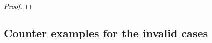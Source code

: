 \begin{proof}
    
\end{proof}
    
\subsection{Counter examples for the invalid cases}

\subsection{}

    

    
    
    
    
    